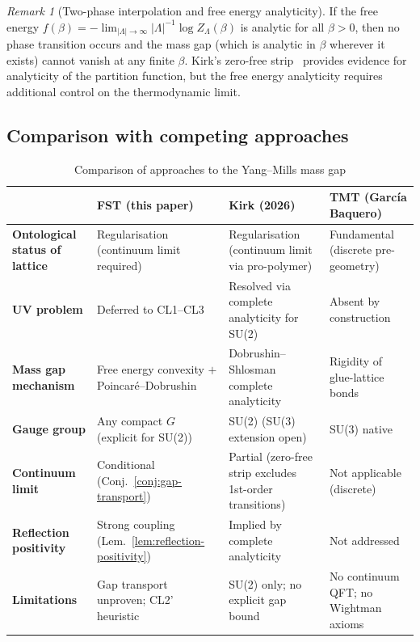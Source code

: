 \documentclass[12pt,a4paper]{article}
\theoremstyle{definition}
\theoremstyle{plain}
\theoremstyle{remark}
\newtheorem{remark}[definition]{Remark}
\begin{document}
\begin{remark}[Two-phase interpolation and free energy analyticity]
\label{rem:two-phase}
If the free energy $f(\beta) = -\lim_{|\Lambda| \to \infty} |\Lambda|^{-1} \log Z_\Lambda(\beta)$ is analytic for all $\beta > 0$, then no phase transition occurs and the mass gap (which is analytic in $\beta$ wherever it exists) cannot vanish at any finite $\beta$. Kirk's zero-free strip~\cite{Kirk2026b} provides evidence for analyticity of the partition function, but the free energy analyticity requires additional control on the thermodynamic limit.
\end{remark}

\subsection{Comparison with competing approaches}

\begin{table}[h]
\centering
\caption{Comparison of approaches to the Yang--Mills mass gap}
\label{tab:comparison}
\begin{tabular}{l|p{3.5cm}|p{3.5cm}|p{3.5cm}}
\hline
& \textbf{FST (this paper)} & \textbf{Kirk (2026)} & \textbf{TMT (Garc\'ia Baquero)} \\
\hline
\textbf{Ontological status of lattice} & Regularisation (continuum limit required) & Regularisation (continuum limit via pro-polymer) & Fundamental (discrete pre-geometry) \\
\hline
\textbf{UV problem} & Deferred to CL1--CL3 & Resolved via complete analyticity for SU(2) & Absent by construction \\
\hline
\textbf{Mass gap mechanism} & Free energy convexity $+$ Poincar\'e--Dobrushin & Dobrushin--Shlosman complete analyticity & Rigidity of glue-lattice bonds \\
\hline
\textbf{Gauge group} & Any compact $G$ (explicit for SU(2)) & SU(2) (SU(3) extension open) & SU(3) native \\
\hline
\textbf{Continuum limit} & Conditional (Conj.~\ref{conj:gap-transport}) & Partial (zero-free strip excludes 1st-order transitions) & Not applicable (discrete) \\
\hline
\textbf{Reflection positivity} & Strong coupling (Lem.~\ref{lem:reflection-positivity}) & Implied by complete analyticity & Not addressed \\
\hline
\textbf{Limitations} & Gap transport unproven; CL2' heuristic & SU(2) only; no explicit gap bound & No continuum QFT; no Wightman axioms \\
\hline
\end{tabular}
\end{table}
\end{document}
